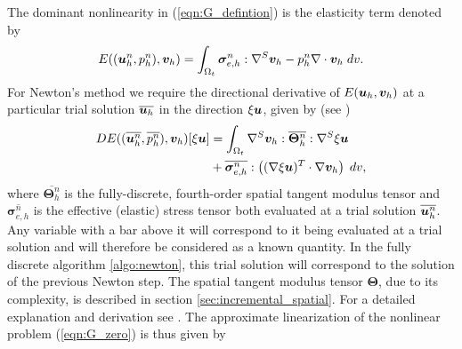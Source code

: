 The dominant nonlinearity in (\ref{eqn:G_defintion}) is the elasticity term denoted by
\begin{equation}
{E}((\boldsymbol{u}_{h}^{n},p_{h}^{n}) ,\boldsymbol{v}_{h})=\int_{\Omega_{t}}
 \boldsymbol{\sigma}^{n}_{e,h}: \nabla^{S} \boldsymbol{v}_{h} -  p_{h}^{n}  \nabla\cdot \boldsymbol{v}_{h} \; dv.
\end{equation}
For Newton's method we require the directional derivative of ${E}(\boldsymbol{u}_{h} ,\boldsymbol{v}_{h})$ at a particular trial solution $ \overline{\boldsymbol{u}_{h}}$ in the direction $\xi\boldsymbol{u}$, given by (see \cite[section 3.5.3]{wriggers2008nonlinear})
\begin{equation}
\begin{gathered}\begin{aligned}
D{E}( (\overline{\boldsymbol{u}_{h}^{n}}, \overline{p_{h}^{n}}) ,\boldsymbol{v}_{h})[\xi\boldsymbol{u}]
&=\int_{\Omega_{t}} \nabla^{S} \boldsymbol{v}_{h} : \overline{\boldsymbol{\Theta}^{n}_{h}} :
 \nabla^{S} \xi\boldsymbol{u}  \\
&+
\overline{\boldsymbol{\sigma}^{n}_{e,h}} : \left( (\nabla \xi\boldsymbol{u})^{T} \cdot \nabla \boldsymbol{v}_{h} \right) \; dv,
\end{aligned}\end{gathered}
\end{equation}
where $\overline{\mathbf{\Theta}^{n}_{h}}$ is the fully-discrete, fourth-order spatial tangent modulus tensor and $\overline{\boldsymbol{\sigma}^{n}_{e,h}}$ is the effective (elastic) stress tensor both evaluated at a trial solution $ \overline{\boldsymbol{u}_{h}^{n}}$. Any variable with a bar above it will correspond to it being evaluated at a trial solution and will therefore be considered as a known quantity. In the fully discrete algorithm \ref{algo:newton}, this trial solution will correspond to the solution of the previous Newton step. The spatial tangent modulus tensor $\mathbf\Theta$, due to its complexity, is described in section \ref{sec:incremental_spatial}. For a detailed explanation and derivation see \cite{wriggers2008nonlinear,bonet1997nonlinear}. The approximate linearization of the nonlinear problem (\ref{eqn:G_zero}) is thus given by
